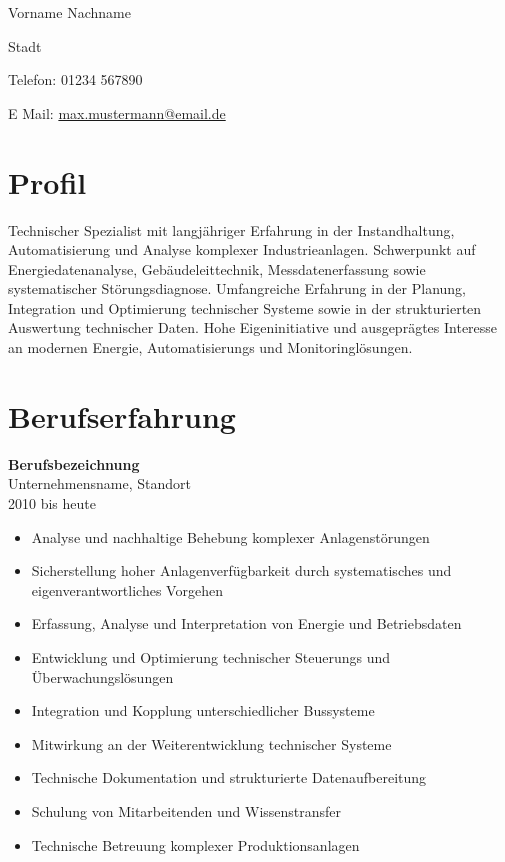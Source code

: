 \documentclass[11pt,a4paper]{article}
\begin{document}
{\headingfont\fontsize{18pt}{20pt}\selectfont Vorname Nachname}

\vspace{0.2cm}

Stadt

Telefon: 01234 567890

E Mail: \href{mailto:max.mustermann@email.de}{max.mustermann@email.de}

\vspace{0.9cm}


\section*{Profil}

Technischer Spezialist mit langjähriger Erfahrung in der Instandhaltung, Automatisierung und Analyse komplexer Industrieanlagen. Schwerpunkt auf Energiedatenanalyse, Gebäudeleittechnik, Messdatenerfassung sowie systematischer Störungsdiagnose. Umfangreiche Erfahrung in der Planung, Integration und Optimierung technischer Systeme sowie in der strukturierten Auswertung technischer Daten. Hohe Eigeninitiative und ausgeprägtes Interesse an modernen Energie, Automatisierungs und Monitoringlösungen.


\section*{Berufserfahrung}

\textbf{Berufsbezeichnung}\\
Unternehmensname, Standort\\
2010 bis heute

\begin{itemize}
\item Analyse und nachhaltige Behebung komplexer Anlagenstörungen
\item Sicherstellung hoher Anlagenverfügbarkeit durch systematisches und eigenverantwortliches Vorgehen
\item Erfassung, Analyse und Interpretation von Energie und Betriebsdaten
\item Entwicklung und Optimierung technischer Steuerungs und Überwachungslösungen
\item Integration und Kopplung unterschiedlicher Bussysteme
\item Mitwirkung an der Weiterentwicklung technischer Systeme
\item Technische Dokumentation und strukturierte Datenaufbereitung
\item Schulung von Mitarbeitenden und Wissenstransfer
\item Technische Betreuung komplexer Produktionsanlagen
\end{itemize}
\end{document}
